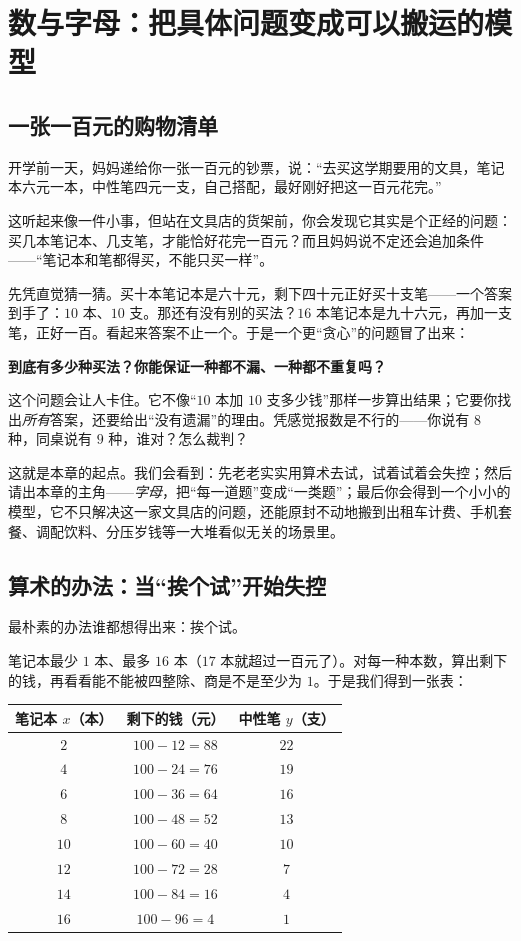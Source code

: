 \chapter{数与字母：把具体问题变成可以搬运的模型}

\section{一张一百元的购物清单}

开学前一天，妈妈递给你一张一百元的钞票，说：“去买这学期要用的文具，笔记本六元一本，中性笔四元一支，自己搭配，最好刚好把这一百元花完。”

这听起来像一件小事，但站在文具店的货架前，你会发现它其实是个正经的问题：买几本笔记本、几支笔，才能恰好花完一百元？而且妈妈说不定还会追加条件——“笔记本和笔都得买，不能只买一样”。

先凭直觉猜一猜。买十本笔记本是六十元，剩下四十元正好买十支笔——一个答案到手了：$10$ 本、$10$ 支。那还有没有别的买法？$16$ 本笔记本是九十六元，再加一支笔，正好一百。看起来答案不止一个。于是一个更“贪心”的问题冒了出来：

\begin{center}
\textbf{到底有多少种买法？你能保证一种都不漏、一种都不重复吗？}
\end{center}

这个问题会让人卡住。它不像“$10$ 本加 $10$ 支多少钱”那样一步算出结果；它要你找出\emph{所有}答案，还要给出“没有遗漏”的理由。凭感觉报数是不行的——你说有 $8$ 种，同桌说有 $9$ 种，谁对？怎么裁判？

这就是本章的起点。我们会看到：先老老实实用算术去试，试着试着会失控；然后请出本章的主角——\emph{字母}，把“每一道题”变成“一类题”；最后你会得到一个小小的模型，它不只解决这一家文具店的问题，还能原封不动地搬到出租车计费、手机套餐、调配饮料、分压岁钱等一大堆看似无关的场景里。

\section{算术的办法：当“挨个试”开始失控}

最朴素的办法谁都想得出来：挨个试。

笔记本最少 $1$ 本、最多 $16$ 本（$17$ 本就超过一百元了）。对每一种本数，算出剩下的钱，再看看能不能被四整除、商是不是至少为 $1$。于是我们得到一张表：

\begin{center}
\begin{tabular}{ccc}
\toprule
笔记本 $x$（本） & 剩下的钱（元） & 中性笔 $y$（支） \\
\midrule
$2$ & $100-12=88$ & $22$ \\
$4$ & $100-24=76$ & $19$ \\
$6$ & $100-36=64$ & $16$ \\
$8$ & $100-48=52$ & $13$ \\
$10$ & $100-60=40$ & $10$ \\
$12$ & $100-72=28$ & $7$ \\
$14$ & $100-84=16$ & $4$ \\
$16$ & $100-96=4$ & $1$ \\
\bottomrule
\end{tabular}
\end{center}

